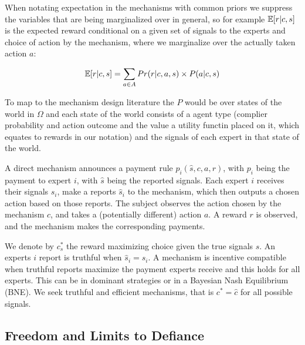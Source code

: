 When notating expectation in the mechanisms with common priors we suppress the variables that are being marginalized over in general, so for example $\operatorname*{\mathbb E}[r|c,s]$ is the expected reward conditional on a given set of signals to the experts and choice of action by the mechanism, where we  marginalize over the actually taken action $a$:

\[
\operatorname*{\mathbb E}[r|c,s] = \sum_{a \in A} Pr(r|c,a,s) \times P(a|c,s) 
\]


To map to the mechanism design literature the $P$ would be over states of the world in $\Omega$ and each state of the world consists of a agent type (complier probability and action outcome and the value a utility functin placed on it, which equates to rewards in our notation) and the signals of each expert in that state of the world.



A direct mechanism announces a payment rule $p_i(\hat{s}, c,a,r)$, with $p_i$ being the payment to expert $i$, with $\hat{s}$ being the reported signals. 
Each expert $i$ receives their signals $s_i$, make a reports $\hat{s}_i$ to the mechanism, which then outputs a chosen action based on those reports.
The subject observes the action chosen by the mechanism $c$, and takes a (potentially different) action $a$. A reward $r$ is observed, and the mechanism makes the corresponding payments.

We denote by $c^{*}_s$ the reward maximizing choice given the true signals $s$.
An experts $i$ report is truthful when $\hat{s}_i=s_i$. A mechanism is incentive compatible when truthful reports maximize the payment experts receive and this holds for all experts. This can be in dominant strategies or in a Bayesian Nash Equilibrium (BNE).  We seek truthful and efficient mechanisms, that is $c^{*} = \hat{c}$ for all possible signals.






\subsection{Freedom and Limits to Defiance}

